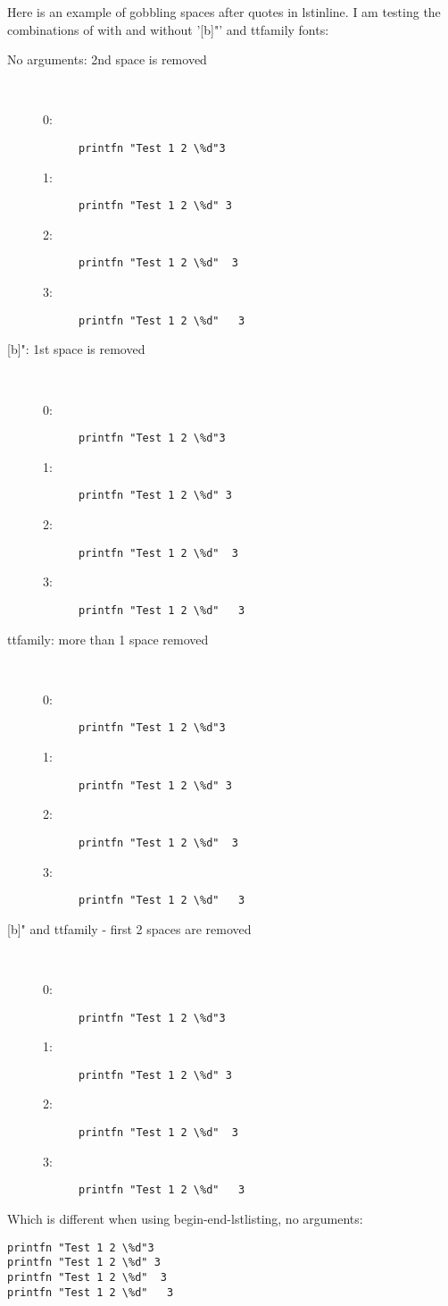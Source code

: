 \documentclass{article}
\begin{document}
\noindent Here is an example of gobbling spaces after quotes in lstinline. I am testing the combinations of with and without '[b]"' and ttfamily fonts:

\begin{description}
\item[No arguments: 2nd space is removed]~\\
  \begin{description}
  \item[0:] \lstinline !printfn "Test 1 2 \%d"3!
  \item[1:] \lstinline !printfn "Test 1 2 \%d" 3!
  \item[2:] \lstinline !printfn "Test 1 2 \%d"  3!
  \item[3:] \lstinline !printfn "Test 1 2 \%d"   3!
  \end{description}
\item[{[b]"}: 1st space is removed]~\\
  \begin{description}
  \item[0:] \lstinline[morestring={[b]"}] !printfn "Test 1 2 \%d"3!
  \item[1:] \lstinline[morestring={[b]"}] !printfn "Test 1 2 \%d" 3!
  \item[2:] \lstinline[morestring={[b]"}] !printfn "Test 1 2 \%d"  3!
  \item[3:] \lstinline[morestring={[b]"}] !printfn "Test 1 2 \%d"   3!
  \end{description}
\item[ttfamily: more than 1 space removed]~\\
   \begin{description}
  \item[0:] \lstinline[basicstyle=\ttfamily] !printfn "Test 1 2 \%d"3!
  \item[1:] \lstinline[basicstyle=\ttfamily] !printfn "Test 1 2 \%d" 3!
  \item[2:] \lstinline[basicstyle=\ttfamily] !printfn "Test 1 2 \%d"  3!
  \item[3:] \lstinline[basicstyle=\ttfamily] !printfn "Test 1 2 \%d"   3!
  \end{description}
\item[{[b]"} and ttfamily - first 2 spaces are removed]~\\
   \begin{description}
  \item[0:] \lstinline[morestring={[b]"},basicstyle=\ttfamily] !printfn "Test 1 2 \%d"3!
  \item[1:] \lstinline[morestring={[b]"},basicstyle=\ttfamily] !printfn "Test 1 2 \%d" 3!
  \item[2:] \lstinline[morestring={[b]"},basicstyle=\ttfamily] !printfn "Test 1 2 \%d"  3!
  \item[3:] \lstinline[morestring={[b]"},basicstyle=\ttfamily] !printfn "Test 1 2 \%d"   3!
  \end{description}
\end{description}
Which is different when using begin-end-lstlisting, no arguments:
\begin{lstlisting}
printfn "Test 1 2 \%d"3
printfn "Test 1 2 \%d" 3
printfn "Test 1 2 \%d"  3 
printfn "Test 1 2 \%d"   3 
\end{lstlisting}
\end{document}
